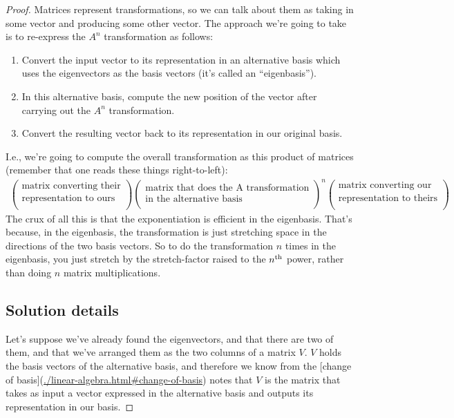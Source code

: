 \begin{proof}
Matrices represent transformations, so we can talk about them as taking in some
vector and producing some other vector. The approach we're going to take is to
re-express the $A^n$ transformation as follows:

\begin{enumerate}
\item Convert the input vector to its representation in an alternative basis which uses the
  eigenvectors as the basis vectors (it's called an ``eigenbasis'').
\item In this alternative basis, compute the new position of the vector after carrying out the
  $A^n$ transformation.
\item Convert the resulting vector back to its representation in our original basis.
\end{enumerate}

I.e., we're going to compute the overall transformation as this product of
matrices (remember that one reads these things right-to-left):
\begin{align*}
  \begin{pmatrix}\text{matrix converting their}\\\text{representation to ours} \\ \end{pmatrix}
  \begin{pmatrix}\text{matrix that does the A transformation}\\\text{in the alternative basis} \\ \end{pmatrix}^n
  \begin{pmatrix}\text{matrix converting our}\\\text{representation to theirs} \\ \end{pmatrix}
\end{align*}
The crux of all this is that the exponentiation is efficient in the
eigenbasis. That's because, in the eigenbasis, the transformation is just
stretching space in the directions of the two basis vectors. So to do the
transformation $n$ times in the eigenbasis, you just stretch by the
stretch-factor raised to the $n^{\text{th}}$ power, rather than doing $n$ matrix
multiplications.

\subsection*{Solution details}

Let's suppose we've already found the eigenvectors, and that there are two of
them, and that we've arranged them as the two columns of a matrix $V$. $V$ holds
the basis vectors of the alternative basis, and therefore we know from the
[change of basis](\url{./linear-algebra.html#change-of-basis}) notes that $V$ is the
matrix that takes as input a vector expressed in the alternative basis and
outputs its representation in our basis.


\end{proof}
